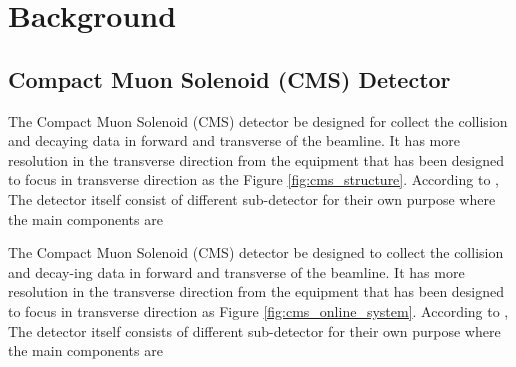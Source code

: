 \chapter{Background}


\section{Compact Muon Solenoid (CMS) Detector}

The Compact Muon Solenoid (CMS) detector be designed for collect the collision and decaying data in forward and transverse of the beamline.
It has more resolution in the transverse direction from the equipment that has been designed to focus in transverse direction as the Figure \ref{fig:cms_structure}.
According to \cite{cms_design_report}, The detector itself consist of different sub-detector for their own purpose where the main components are

The Compact Muon Solenoid (CMS) detector be designed to collect the collision and decay-ing data in forward and transverse of the beamline.
It has more resolution in the transverse direction from the equipment that has been designed to focus in transverse direction as Figure \ref{fig:cms_online_system}.
According to \cite{cms_design_report}, The detector itself consists of different sub-detector for their own purpose where the main components are


